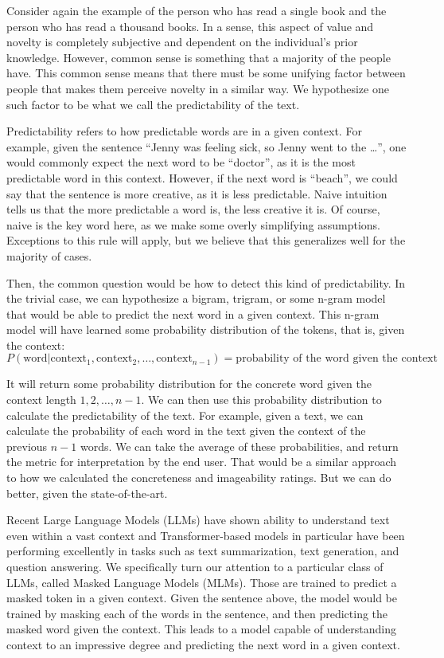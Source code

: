 Consider again the example of the person who has read a single book and the person who has read a thousand books. In a sense, this aspect of value and novelty is completely subjective and dependent on the individual's prior knowledge. However, common sense is something that a majority of the people have. This common sense means that there must be some unifying factor between people that makes them perceive novelty in a similar way. We hypothesize one such factor to be what we call the predictability of the text.

Predictability refers to how predictable words are in a given context. For example, given the sentence ``Jenny was feeling sick, so Jenny went to the \dots'', one would commonly expect the next word to be ``doctor'', as it is the most predictable word in this context. However, if the next word is ``beach'', we could say that the sentence is more creative, as it is less predictable. Naive intuition tells us that the more predictable a word is, the less creative it is. Of course, naive is the key word here, as we make some overly simplifying assumptions. Exceptions to this rule will apply, but we believe that this generalizes well for the majority of cases. 

Then, the common question would be how to detect this kind of predictability. In the trivial case, we can hypothesize a bigram, trigram, or some n-gram model that would be able to predict the next word in a given context. This n-gram model will have learned some probability distribution of the tokens, that is, given the context:
\begin{equation}
    P(\text{word}| \text{context}_1, \text{context}_2, \dots, \text{context}_{n-1}) = \text{probability of the word given the context}
\end{equation}

It will return some probability distribution for the concrete word given the context length $1, 2, \dots, n-1$. 
We can then use this probability distribution to calculate the predictability of the text. For example, given a text, we can calculate the probability of each word in the text given the context of the previous $n-1$ words. We can take the average of these probabilities, and return the metric for interpretation by the end user. That would be a similar approach to how we calculated the concreteness and imageability ratings. But we can do better, given the state-of-the-art.

Recent Large Language Models (LLMs) have shown ability to understand text even within a vast context and Transformer-based models in particular have been performing excellently in tasks such as text summarization, text generation, and question answering. We specifically turn our attention to a particular class of LLMs, called Masked Language Models (MLMs). Those are trained to predict a masked token in a given context. Given the sentence above, the model would be trained by masking each of the words in the sentence, and then predicting the masked word given the context. This leads to a model capable of understanding context to an impressive degree and predicting the next word in a given context.

